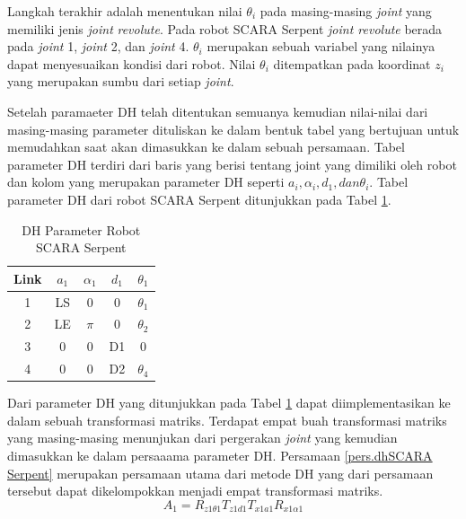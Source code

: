 Langkah terakhir adalah menentukan nilai $\theta_{i}$ pada masing-masing \textit{joint} yang memiliki jenis \textit{joint}  \textit{revolute}. Pada robot SCARA Serpent \textit{joint revolute} berada pada \textit{joint} 1, \textit{joint} 2, dan \textit{joint} 4.  $\theta_{i}$ merupakan sebuah variabel yang nilainya dapat menyesuaikan kondisi dari robot. Nilai  $\theta_{i}$ ditempatkan pada koordinat $z_{i}$ yang merupakan sumbu dari setiap \textit{joint}. 

Setelah paramaeter DH telah ditentukan semuanya kemudian nilai-nilai dari masing-masing parameter dituliskan ke dalam bentuk tabel yang bertujuan untuk memudahkan saat akan dimasukkan ke dalam sebuah persamaan. Tabel parameter DH terdiri dari baris yang berisi tentang joint yang dimiliki oleh robot dan kolom yang merupakan parameter DH seperti $a_{i},\alpha_{i}, d_{1}, dan \theta_{i}$. Tabel parameter DH dari robot SCARA Serpent ditunjukkan pada Tabel \ref{dh.SCARA Serpent}. 

\begin{table}[H]
	\centering
	\caption{DH Parameter Robot SCARA Serpent}
	\label{dh.SCARA Serpent}
	
	\begin{tabular}{|c|c|c|c|c|}
		\hline
		\rowcolor[HTML]{9B9B9B} 
		Link & $a_{1}$ & $\alpha_{1}$ & $d_{1}$ & $\theta_{1}$ \\ \hline
		1    & LS & 0      & 0     & $\theta_{1}$     \\ \hline
		2    & LE & $\pi$    & 0     & $\theta_{2}	$     \\ \hline
		3    & 0     & 0      & D1 & 0          \\ \hline
		4    & 0     & 0      & D2 & $\theta_{4}$ \\ \hline
	\end{tabular}
	
\end{table}

Dari parameter DH yang ditunjukkan pada Tabel \ref{dh.SCARA Serpent} dapat diimplementasikan ke dalam sebuah transformasi matriks. Terdapat empat buah transformasi matriks yang masing-masing menunjukan dari pergerakan \textit{joint} yang kemudian dimasukkan ke dalam persaaama parameter DH. Persamaan \ref{pers.dhSCARA Serpent} merupakan persamaan utama dari metode DH yang dari persamaan tersebut dapat dikelompokkan menjadi empat transformasi matriks.
\begin{equation}
A_{1} = R_{z1\theta1}T_{z1d1}T_{x1a1}R_{x1\alpha1}
\label{pers.dhSCARA Serpent}
\end{equation}

